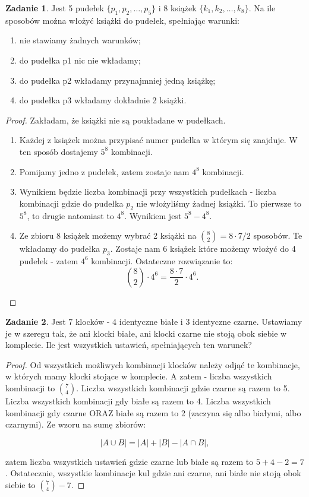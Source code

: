 \documentclass[11pt]{article}
\theoremstyle{definition}
\newtheorem{zadanie}{Zadanie}
\numberwithin{zadanie}{subsection}
\begin{document}
\begin{zadanie}
    Jest 5 pudełek $\{ p_1, p_2, \dots , p_5 \}$ i 8 książek $\{ k_1, k_2, \dots, k_8 \}$.
    Na ile sposobów można włożyć książki do pudełek, spełniając warunki:
    \begin{enumerate}
        \item nie stawiamy żadnych warunków;
        \item do pudełka p1 nic nie wkładamy;
        \item do pudełka p2 wkładamy przynajmniej jedną książkę;
        \item do pudełka p3 wkładamy dokładnie 2 książki.
    \end{enumerate}
\end{zadanie}
\begin{proof}
    Zakładam, że książki nie są poukładane w pudełkach.
    \begin{enumerate}
        \item Każdej z książek można przypisać numer pudełka w którym się znajduje. W ten sposób dostajemy $5^8$ kombinacji.
        \item Pomijamy jedno z pudełek, zatem zostaje nam $4^8$ kombinacji.
        \item Wynikiem będzie liczba kombinacji przy wszystkich pudełkach - liczba kombinacji gdzie do pudełka $p_2$ nie włożyliśmy żadnej książki. To pierwsze to $5^8$, to drugie natomiast to $4^8$. Wynikiem jest $5^8-4^8$.
        \item Ze zbioru 8 książek możemy wybrać 2 książki na $\binom82 = 8\cdot 7/2$ sposobów. Te wkładamy do pudełka $p_3$. Zostaje nam 6 książek które możemy włożyć do 4 pudełek - zatem $4^6$ kombinacji. Ostateczne rozwiązanie to:
              $$\binom82\cdot4^6 = \frac{8\cdot7}2\cdot4^6.$$
    \end{enumerate}
\end{proof}

\begin{zadanie}
    Jest 7 klocków - 4 identyczne białe i 3 identyczne czarne. Ustawiamy je w szeregu tak, że ani klocki białe, ani klocki czarne nie stoją obok siebie w komplecie. Ile jest wszystkich ustawień, spełniających ten warunek?
\end{zadanie}
\begin{proof}
    Od wszystkich możliwych kombinacji klocków należy odjąć te kombinacje, w których mamy klocki stojące w komplecie. A zatem - liczba wszystkich kombinacji to $\binom74$. Liczba wszystkich kombinacji gdzie czarne są razem to 5. Liczba wszystkich kombinacji gdy białe są razem to 4. Liczba wszystkich kombinacji gdy czarne ORAZ białe są razem to 2 (zaczyna się albo białymi, albo czarnymi). Ze wzoru na sumę zbiorów:

    $$|A\cup B| = |A|+|B| - |A\cap B|,$$

    zatem liczba wszystkich ustawień gdzie czarne lub białe są razem to $5+4-2 = 7$. Ostatecznie, wszystkie kombinacje kul gdzie ani czarne, ani białe nie stoją obok siebie to $\binom74-7$.
\end{proof}
\end{document}
